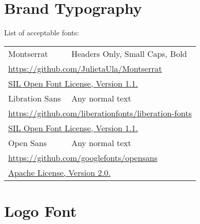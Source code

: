 \documentclass{logo_styleguide}
\begin{document}
\section{Brand Typography}
List of acceptable fonts:\\
\begin{tabular}{ll}
Montserrat & Headers Only, Small Caps, Bold\\
\multicolumn{2}{l}{\url{https://github.com/JulietaUla/Montserrat}}\\
\multicolumn{2}{l}{\href{https://scripts.sil.org/cms/scripts/page.php?site_id=nrsi\&id=OFL}{SIL Open Font License, Version 1.1.}}\\[1em]

Libration Sans & Any normal text\\
\multicolumn{2}{l}{\url{https://github.com/liberationfonts/liberation-fonts}}\\
\multicolumn{2}{l}{\href{https://scripts.sil.org/cms/scripts/page.php?site_id=nrsi\&id=OFL}{SIL Open Font License, Version 1.1.}}\\[1em]

Open Sans & Any normal text\\
\multicolumn{2}{l}{\url{https://github.com/googlefonts/opensans}}\\
\multicolumn{2}{l}{\href{http://www.apache.org/licenses/LICENSE-2.0}{Apache License, Version 2.0.}}\\[1em]
\end{tabular}






\section{Logo Font}
\end{document}

